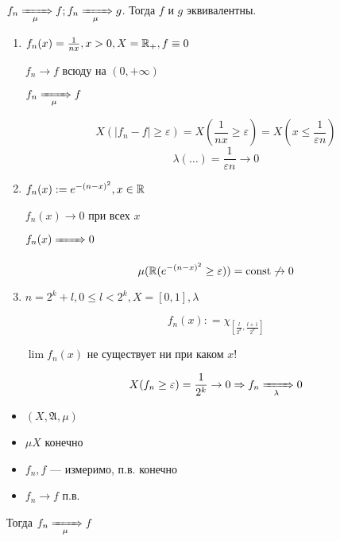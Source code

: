 \begin{exercise} %
    \(f_n \xRightarrow[\mu]{\qquad} f; f_n \xRightarrow[\mu]{\qquad} g\). Тогда \(f\) и \(g\) эквивалентны.
\end{exercise}

\begin{example}\itemfix
    \begin{enumerate}
        \item \(f_n(x) = \frac{1}{nx}, x > 0, X = \mathbb{R}_{ +}, f \equiv 0\)

              \(f_n \to f\) всюду на \((0, +\infty)\)

              \(f_n \xRightarrow[\mu]{\qquad} f\)

              \[X(|f_n - f| \geq \varepsilon) = X\left(\frac{1}{nx} \geq \varepsilon\right) = X(x \leq \frac{1}{\varepsilon n})\]
              \[\lambda(\dots ) = \frac{1}{\varepsilon n} \to 0\]

        \item \(f_n(x) : = e^{ -(n - x)^2}, x\in\mathbb{R}\)

              \(f_n(x) \to 0\) при всех \(x\)

              \(f_n(x) \xRightarrow[]{\qquad} 0\)

              \[\mu(\mathbb{R}(e^{ -(n - x)^2} \geq \varepsilon)) = \text{const} \not\to 0\]

        \item \(n = 2^k + l, 0 \leq l < 2^k, X = [0, 1], \lambda\)

              \[f_n(x) : = \chi_{[\frac{l}{2^k}, \frac{l + 1}{2^k} ]}\]

              \(\lim f_n(x)\) не существует ни при каком \(x\)!

              \[X(f_n \geq \varepsilon) = \frac{1}{2^k} \to 0 \Rightarrow f_n \xRightarrow[\lambda]{\qquad} 0\]
    \end{enumerate}
\end{example}

\begin{theorem}[Лебега]\itemfix
    \begin{itemize}
        \item \((X, \mathfrak{A}, \mu)\)
        \item \(\mu X\) конечно
        \item \(f_n, f\) --- измеримо, п.в. конечно
        \item \(f_n \to f\) п.в.
    \end{itemize}

    Тогда \(f_n \xRightarrow[\mu]{\qquad} f\)
\end{theorem}

